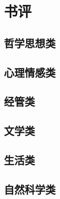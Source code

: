 \documentclass[linespread=1.5]{ctexbook}
\title{\heiti{阅读、电影}}
\author{\kaishu{北方以北}}
\begin{document}
\maketitle

\tableofcontents

\chapter{书评}

\section{哲学思想类}









\section{心理情感类}


\section{经管类}






\section{文学类}


































\section{生活类}





\section{自然科学类}








\end{document}
